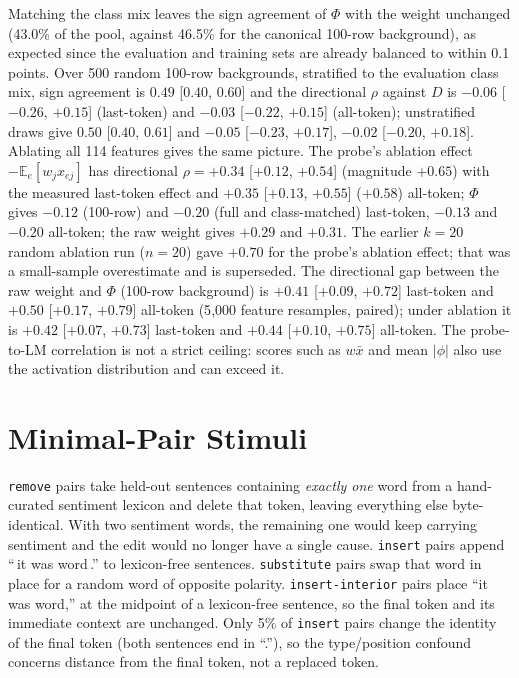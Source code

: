 Matching the class mix leaves the sign agreement of $\Phi$ with the weight unchanged (43.0\% of the pool, against 46.5\% for the canonical 100-row background), as expected since the evaluation and training sets are already balanced to within 0.1 points. Over 500 random 100-row backgrounds, stratified to the evaluation class mix, sign agreement is $0.49$ [$0.40$, $0.60$] and the directional $\rho$ against $D$ is $-0.06$ [$-0.26$, $+0.15$] (last-token) and $-0.03$ [$-0.22$, $+0.15$] (all-token); unstratified draws give $0.50$ [$0.40$, $0.61$] and $-0.05$ [$-0.23$, $+0.17$], $-0.02$ [$-0.20$, $+0.18$]. Ablating all 114 features gives the same picture. The probe's ablation effect $-\mathbb{E}_e[w_jx_{ej}]$ has directional $\rho=+0.34$ [$+0.12$, $+0.54$] (magnitude $+0.65$) with the measured last-token effect and $+0.35$ [$+0.13$, $+0.55$] ($+0.58$) all-token; $\Phi$ gives $-0.12$ (100-row) and $-0.20$ (full and class-matched) last-token, $-0.13$ and $-0.20$ all-token; the raw weight gives $+0.29$ and $+0.31$. The earlier $k=20$ random ablation run ($n=20$) gave $+0.70$ for the probe's ablation effect; that was a small-sample overestimate and is superseded. The directional gap between the raw weight and $\Phi$ (100-row background) is $+0.41$ [$+0.09$, $+0.72$] last-token and $+0.50$ [$+0.17$, $+0.79$] all-token (5{,}000 feature resamples, paired); under ablation it is $+0.42$ [$+0.07$, $+0.73$] last-token and $+0.44$ [$+0.10$, $+0.75$] all-token. The probe-to-LM correlation is not a strict ceiling: scores such as $w\bar{x}$ and mean $|\phi|$ also use the activation distribution and can exceed it.

\clearpage
\section{Minimal-Pair Stimuli}
\label{app:minimal-pairs}

\texttt{remove} pairs take held-out sentences containing \emph{exactly one}
word from a hand-curated sentiment lexicon and delete that token, leaving
everything else byte-identical. With two sentiment words, the remaining one
would keep carrying sentiment and the edit would no longer have a single
cause. \texttt{insert} pairs append ``\,it was
\textlangle word\textrangle\,.'' to lexicon-free sentences.
\texttt{substitute} pairs swap that word in place for a random word of
opposite polarity. \texttt{insert-interior} pairs place ``it was
\textlangle word\textrangle,'' at the midpoint of a lexicon-free sentence,
so the final token and its immediate context are unchanged. Only 5\% of
\texttt{insert} pairs change the identity of the final token (both
sentences end in ``.''), so the type/position confound concerns distance
from the final token, not a replaced token.

